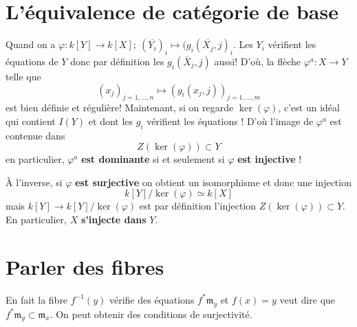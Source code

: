 \documentclass[a4paper,12pt]{book}
\newcommand{\m}{\mathfrak{m}}
\theoremstyle{plain}
\theoremstyle{definition}
\theoremstyle{remark}
\begin{document}
\section{L'équivalence de catégorie de base}
Quand on a $\varphi\colon k[Y]\to k[X];~(\overline{Y_i})_i\mapsto 
(g_i(\overline{X_j},j)_i$. Les $Y_i$ vérifient les équations de $Y$
donc par définition les $g_i(\overline{X}_j,j)$ aussi! D'où, la flèche 
$\varphi^a\colon X\to Y$ telle que 
\[(x_j)_{j=1,\ldots,n}\mapsto (g_i(x_j,j))_{j=1,\ldots, m}\]
est bien définie et régulière! Maintenant, si on regarde $\ker(\varphi)$,
c'est un idéal qui contient $I(Y)$ et dont les $g_i$ vérifient les 
équations ! D'où l'image de $\varphi^a$ est contenue dans 
\[Z(\ker(\varphi))\subset Y\]
en particulier, $\varphi^a$ \textbf{est dominante} si et seulement si 
$\varphi$ \textbf{est injective} !

À l'inverse, si $\varphi$ \textbf{est surjective} on obtient un
isomorphisme et donc une injection 
\[k[Y]/\ker(\varphi)\simeq k[X]\]
mais $k[Y]\to k[Y]/\ker(\varphi)$ est par définition l'injection 
$Z(\ker(\varphi))\subset Y$. En particulier, $X$ \textbf{s'injecte dans}
$Y$.
\section{Parler des fibres}
En fait la fibre $f^{-1}(y)$ vérifie des équations $f^*\m_y$ et 
$f(x)=y$ veut dire que $f^*\m_y\subset \m_x$. On peut obtenir 
des conditions de surjectivité.





\printbibliography
\end{document}
